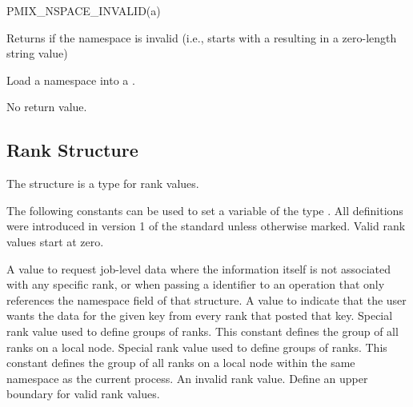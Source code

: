 \cspecificstart
\begin{codepar}
PMIX_NSPACE_INVALID(a)
\end{codepar}
\cspecificend

\begin{arglist}
\end{arglist}

Returns  if the namespace is invalid (i.e., starts with a  resulting in a zero-length string value)


Load a namespace into a .


\begin{arglist}
\end{arglist}

No return value.


\subsection{Rank Structure}

The  structure is a  type for rank values.


The following constants can be used to set a variable of the type . All definitions were introduced in version 1 of the standard unless otherwise marked. Valid rank values start at zero.

\begin{constantdesc}
%
A value to request job-level data where the information itself is not associated with any specific rank, or when passing a  identifier to an operation that only references the namespace field of that structure.
%
A value to indicate that the user wants the data for the given key from every rank that posted that key.
%
Special rank value used to define groups of ranks.
This constant defines the group of all ranks on a local node.
%
Special rank value used to define groups of ranks.
This constant defines the group of all ranks on a local node within the same namespace as the current process.
%
An invalid rank value.
%
Define an upper boundary for valid rank values.
%
\end{constantdesc}


